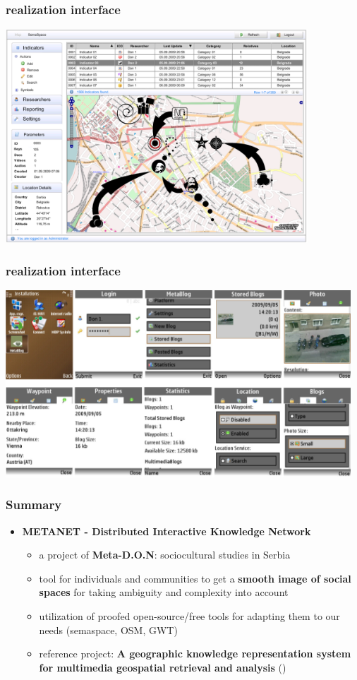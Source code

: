 \documentclass[blue]{beamer}
\begin{document}
\frame
{
\frametitle{\textbf{realization interface}}
\includegraphics[width=0.85\textwidth]{bin/features/metamap/02_gui_metamap_admin_start_update.png}
}

\frame
{
\frametitle{\textbf{realization interface}}
\includegraphics[width=0.97\textwidth]{bin/features/metablog/01_gui_metablog_update.png}
}


\frame
{
\frametitle{\textbf{Summary}}
\begin{itemize}
\item \textbf{METANET - Distributed Interactive Knowledge Network}
	\begin{itemize}
		\item a project of \textbf{Meta-D.O.N}: sociocultural studies in Serbia
		\item tool for individuals and communities to get a \textbf{smooth image of social spaces} for taking ambiguity and complexity into account
		\item utilization of proofed open-source/free tools for adapting them to our needs (semaspace, OSM, GWT)
		\item reference project: \textbf{A geographic knowledge representation system for multimedia geospatial retrieval and analysis}
		()
	\end{itemize}
\end{itemize}
}


\end{document}
